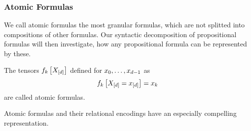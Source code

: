 \subsubsection{Atomic Formulas}

We call atomic formulas the most granular formulas, which are not splitted into compositions of other formulas.
Our syntactic decomposition of propositional formulas will then investigate, how any propositional formula can be represented by these.

\begin{definition}
	The tensors $f_{k}\left[X_{[d]}\right]$ defined for $x_{0},\ldots,x_{d-1}$ as
		\[ f_{k}\left[X_{[d]}=x_{[d]}\right] 
		= x_{k} \]
	are called atomic formulas.
\end{definition}

Atomic formulas and their relational encodings have an especially compelling representation.

